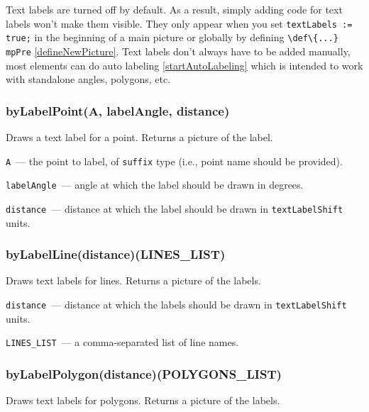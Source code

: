 Text labels are turned off by default. As a result, simply adding code for text labels won't make them visible. They only appear when you set \texttt{textLabels := true;} in the beginning of a main picture or globally by defining \texttt{\textbackslash def\textbackslash\{...\} mpPre} \ref{defineNewPicture}. Text labels don't always have to be added manually, most elements can do auto labeling \ref{startAutoLabeling} which is intended to work with standalone angles, polygons, etc. 


\subsubsection{byLabelPoint(A, labelAngle, distance)}\label{byLabelPoint}
Draws a text label for a point. Returns a picture of the label.
	
	\texttt{A}~— the point to label, of \texttt{suffix} type (i.e., point name should be provided).
	
	\texttt{labelAngle}~— angle at which the label should be drawn in degrees.
	
	\texttt{distance}~— distance at which the label should be drawn in \texttt{textLabelShift} units.

\subsubsection{byLabelLine(distance)(LINES\_LIST)}\label{byLabelLine}
	
	Draws text labels for lines. Returns a picture of the labels.
	
	\texttt{distance}~— distance at which the labels should be drawn in \texttt{textLabelShift} units.
	
	\texttt{LINES\_LIST}~— a comma-separated list of line names.

\subsubsection{byLabelPolygon(distance)(POLYGONS\_LIST)}\label{byLabelPolygon}
	
	Draws text labels for polygons. Returns a picture of the labels.
	
